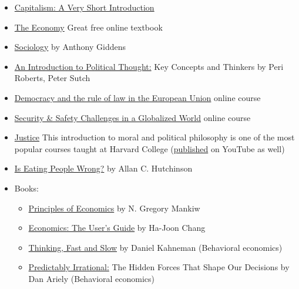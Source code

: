 \documentclass{article}
\begin{document}
\begin{itemize}
    \item \href{https://academic.oup.com/book/672}{Capitalism: A Very Short Introduction}
    \item \href{https://www.core-econ.org/the-economy/book/text/0-3-contents.html}{The Economy} Great free online textbook
    \item \href{https://www.goodreads.com/book/show/46423.Sociology}{Sociology} by Anthony Giddens
    \item \href{https://www.goodreads.com/book/show/5246256-an-introduction-to-political-thought}{An Introduction to Political Thought:} Key Concepts and Thinkers by Peri Roberts, Peter Sutch
    \item \href{https://reconnect-europe.eu/mooc/}{Democracy and the rule of law in the European Union} online course
    \item \href{https://www.coursera.org/learn/security-safety-globalized-world}{Security \& Safety Challenges in a Globalized World} online course
    \item \href{https://www.edx.org/course/justice-2}{Justice} This introduction to moral and political philosophy is one of the most popular courses taught at Harvard College
    (\href{https://www.youtube.com/watch?v=kBdfcR-8hEY}{published} on YouTube as well)
    \item \href{https://www.goodreads.com/en/book/show/10428480-is-eating-people-wrong}{Is Eating People Wrong?}  by Allan C. Hutchinson
    \item Books:
    \begin{itemize}
        \item \href{https://www.goodreads.com/book/show/1753460.Principles_of_Economics}{Principles of Economics} by N. Gregory Mankiw

        \item \href{https://goodreads.com/book/show/20613671.Economics_The_User_s_Guide}{Economics: The User's Guide} by Ha-Joon Chang
        
        \item \href{https://www.goodreads.com/book/show/11468377-thinking-fast-and-slow}{Thinking, Fast and Slow} by Daniel Kahneman (Behavioral economics)

        \item \href{https://www.goodreads.com/book/show/1713426.Predictably_Irrational}{Predictably Irrational:} The Hidden Forces That Shape Our Decisions by Dan Ariely (Behavioral economics)


\end{itemize}
\end{itemize}
\end{document}
